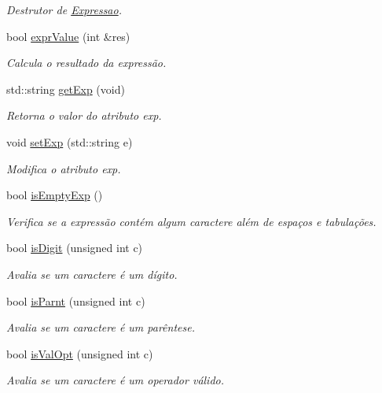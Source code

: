 \begin{DoxyCompactItemize}
\begin{DoxyCompactList}\small\item\em Destrutor de \hyperlink{class_expressao}{Expressao}. \end{DoxyCompactList}\item 
bool \hyperlink{class_expressao_a4fc26c444cd7db30036a7e23f0d1c61b}{expr\-Value} (int \&res)
\begin{DoxyCompactList}\small\item\em Calcula o resultado da expressão. \end{DoxyCompactList}\item 
std\-::string \hyperlink{class_expressao_ab3fd4ae47efcf6c17b245e8387f0260c}{get\-Exp} (void)
\begin{DoxyCompactList}\small\item\em Retorna o valor do atributo exp. \end{DoxyCompactList}\item 
void \hyperlink{class_expressao_a31767733140b94bc842fdde4b5e26ea9}{set\-Exp} (std\-::string e)
\begin{DoxyCompactList}\small\item\em Modifica o atributo exp. \end{DoxyCompactList}\item 
bool \hyperlink{class_expressao_a355f8c921fd7246530eb87d1a841d17e}{is\-Empty\-Exp} ()
\begin{DoxyCompactList}\small\item\em Verifica se a expressão contém algum caractere além de espaços e tabulações. \end{DoxyCompactList}\item 
bool \hyperlink{class_expressao_adad3bc63c44d2def1d31e34d0e7e8d96}{is\-Digit} (unsigned int c)
\begin{DoxyCompactList}\small\item\em Avalia se um caractere é um dígito. \end{DoxyCompactList}\item 
bool \hyperlink{class_expressao_adf12d6d7571fe77d2741b494b9f5e84c}{is\-Parnt} (unsigned int c)
\begin{DoxyCompactList}\small\item\em Avalia se um caractere é um parêntese. \end{DoxyCompactList}\item 
bool \hyperlink{class_expressao_a9f9e7084b531dc4885a783949d64cfa5}{is\-Val\-Opt} (unsigned int c)
\begin{DoxyCompactList}\small\item\em Avalia se um caractere é um operador válido. \end{DoxyCompactList}\item 

\end{DoxyCompactItemize}
